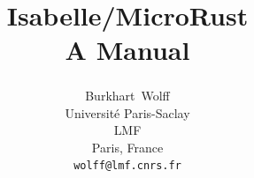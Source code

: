 \documentclass[abstract=on,fontsize=10pt,a4paper,mpinclude=true,
oneside,
pagesize,DIV=14]{scrartcl}
\title{Isabelle/MicroRust\\[.3em]\large A Manual}
\author{
Burkhart~Wolff\textsuperscript{\orcidlink{0000-0002-9648-7663}}\\\small
Universit\'e Paris-Saclay\\
LMF\\
Paris, France\\
\texttt{wolff@lmf.cnrs.fr}
}
\date{}
\begin{document}
\renewcommand{\sectionautorefname}{Section}
\renewcommand{\subsectionautorefname}{Section}
\renewcommand{\subsubsectionautorefname}{Section}

\maketitle



\printbibliography
\end{document}
